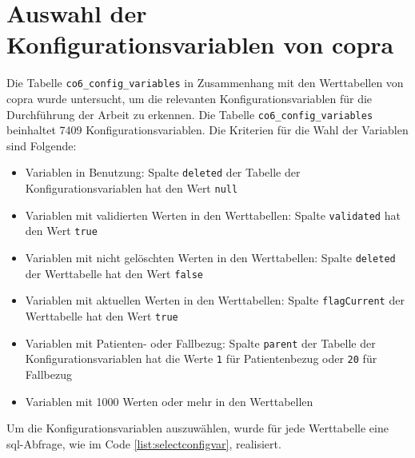 \section{Auswahl der Konfigurationsvariablen von \acs{copra}} \label{sec:configvarcopra}

Die Tabelle \texttt{co6\_config\_variables} in Zusammenhang mit den Werttabellen von \ac{copra} wurde untersucht, um die relevanten Konfigurationsvariablen für die Durchführung der Arbeit zu erkennen. Die Tabelle \texttt{co6\_config\_variables} beinhaltet 7409 Konfigurationsvariablen.
\newpage
Die Kriterien für die Wahl der Variablen sind Folgende:

\begin{itemize}
	\item Variablen in Benutzung: Spalte \texttt{deleted} der Tabelle der Konfigurationsvariablen hat den Wert \texttt{null}
	\item Variablen mit validierten Werten in den Werttabellen: Spalte \texttt{validated} hat den Wert \texttt{true}
	\item Variablen mit nicht gelöschten Werten in den Werttabellen: Spalte \texttt{deleted} der Werttabelle hat den Wert \texttt{false}
	\item Variablen mit aktuellen Werten in den Werttabellen: Spalte \texttt{flagCurrent} der Werttabelle hat den Wert \texttt{true}
	\item Variablen mit Patienten- oder Fallbezug: Spalte \texttt{parent} der Tabelle der Konfigurationsvariablen hat die Werte \texttt{1} für Patientenbezug oder \texttt{20} für Fallbezug
	\item Variablen mit 1000 Werten oder mehr in den Werttabellen
\end{itemize}

Um die Konfigurationsvariablen auszuwählen, wurde für jede Werttabelle eine \ac{sql}-Abfrage, wie im Code \ref{list:selectconfigvar}, realisiert.

